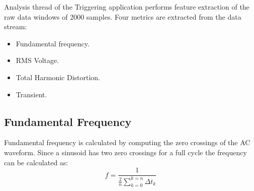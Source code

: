 Analysis thread of the Triggering application performs feature extraction of the raw data windows of 2000 samples.
Four metrics are extracted from the data stream:
\begin{itemize}
	\item Fundamental frequency.
	\item RMS Voltage.
	\item Total Harmonic Distortion.
	\item Transient.
\end{itemize}

\subsection{Fundamental Frequency}\label{subsec:fundamental-frequency}

Fundamental frequency is calculated by computing the zero crossings of the AC waveform.
Since a sinusoid has two zero crossings for a full cycle the frequency can be calculated as:
\begin{equation} \label{eq:1}
 f = \frac{1}{\frac{2}{n}\sum\limits_{k=0}^{k=n}{\Delta t_{k}}}
\end{equation}

